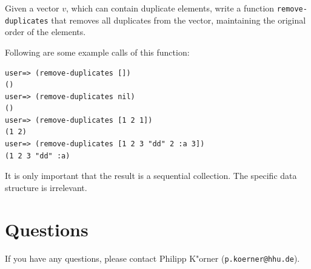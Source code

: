 \documentclass[11pt,a4paper]{article}
\begin{document}
\begin{exercise}
Given a vector $v$, which can contain duplicate elements, write a function \texttt{remove-duplicates} that removes all duplicates from the vector, maintaining the original order of the elements.

Following are some example calls of this function:
\begin{verbatim}
user=> (remove-duplicates [])
()
user=> (remove-duplicates nil)
()
user=> (remove-duplicates [1 2 1])
(1 2)
user=> (remove-duplicates [1 2 3 "dd" 2 :a 3])
(1 2 3 "dd" :a)
\end{verbatim}

It is only important that the result is a sequential collection. The specific data structure is irrelevant.
\end{exercise}


\section*{Questions}
If you have any questions, please contact Philipp K"orner (\texttt{p.koerner@hhu.de}).
\end{document}
